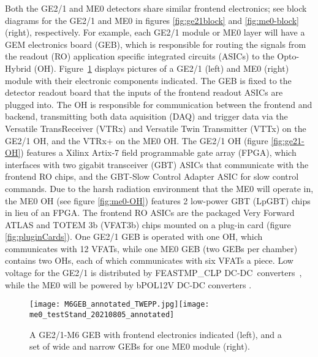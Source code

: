 \documentclass[a4paper,11pt]{article}
\begin{document}
Both the GE2/1 and ME0 detectors share similar frontend electronics; see block diagrams for the GE2/1 and ME0 in figures \ref{fig:ge21block} and \ref{fig:me0-block} (right), respectively. For example, each GE2/1 module or ME0 layer will have a GEM electronics board (GEB), which is responsible for routing the signals from the readout (RO) application specific integrated circuits (ASICs) to the Opto-Hybrid (OH). Figure~\ref{fig:testStands} displays pictures of a GE2/1 (left) and ME0 (right) module with their electronic components indicated. The GEB is fixed to the detector readout board that the inputs of the frontend readout ASICs are plugged into. The OH is responsible for communication between the frontend and backend, transmitting both data aquisition (DAQ) and trigger data via the Versatile TransReceiver (VTRx) and Versatile Twin Transmitter (VTTx) \cite{vlProject} on the GE2/1 OH, and the VTRx+ \cite{vlPlus} on the ME0 OH. The GE2/1 OH \cite{OH} (figure \ref{fig:ge21-OH}) features a Xilinx Artix-7 field programmable gate array (FPGA), which interfaces with two gigabit transceiver (GBT) ASICs that communicate with the frontend RO chips, and the GBT-Slow Control Adapter ASIC for slow control commands. Due to the harsh radiation environment that the ME0 will operate in, the ME0 OH \cite{ASIAGO} (see figure \ref{fig:me0-OH}) features 2 low-power GBT (LpGBT) chips in lieu of an FPGA. The frontend RO ASICs are the packaged Very Forward ATLAS and TOTEM 3b (VFAT3b) chips mounted on a plug-in card \cite{pluginCard} (figure \ref{fig:pluginCards}). One GE2/1 GEB is operated with one OH, which communicates with 12 VFATs, while one ME0 GEB (two GEBs per chamber) contains two OHs, each of which communicates with six VFATs a piece. Low voltage for the GE2/1 is distributed by FEASTMP\_CLP DC-DC~converters~\cite{feast}, while the ME0 will be powered by bPOL12V DC-DC converters \cite{bPOL}. 
\begin{figure}[!hbp]
\centering
\texttt{[image: M6GEB\_annotated\_TWEPP.jpg]}\hspace*{0.4cm}\texttt{[image: me0\_testStand\_20210805\_annotated]}
\caption{\label{fig:testStands}A GE2/1-M6 GEB with frontend electronics indicated (left), and a set of wide and narrow GEBs for one ME0 module (right).}
\end{figure}
\end{document}

